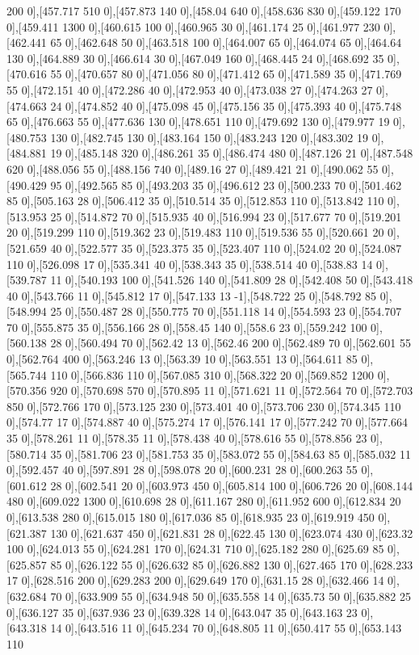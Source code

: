 {200 0],[457.717 510 0],[457.873 140 0],[458.04 640 0],[458.636 830 0],[459.122 170 0],[459.411 1300 0],[460.615 100 0],[460.965 30 0],[461.174 25 0],[461.977 230 0],[462.441 65 0],[462.648 50 0],[463.518 100 0],[464.007 65 0],[464.074 65 0],[464.64 130 0],[464.889 30 0],[466.614 30 0],[467.049 160 0],[468.445 24 0],[468.692 35 0],[470.616 55 0],[470.657 80 0],[471.056 80 0],[471.412 65 0],[471.589 35 0],[471.769 55 0],[472.151 40 0],[472.286 40 0],[472.953 40 0],[473.038 27 0],[474.263 27 0],[474.663 24 0],[474.852 40 0],[475.098 45 0],[475.156 35 0],[475.393 40 0],[475.748 65 0],[476.663 55 0],[477.636 130 0],[478.651 110 0],[479.692 130 0],[479.977 19 0],[480.753 130 0],[482.745 130 0],[483.164 150 0],[483.243 120 0],[483.302 19 0],[484.881 19 0],[485.148 320 0],[486.261 35 0],[486.474 480 0],[487.126 21 0],[487.548 620 0],[488.056 55 0],[488.156 740 0],[489.16 27 0],[489.421 21 0],[490.062 55 0],[490.429 95 0],[492.565 85 0],[493.203 35 0],[496.612 23 0],[500.233 70 0],[501.462 85 0],[505.163 28 0],[506.412 35 0],[510.514 35 0],[512.853 110 0],[513.842 110 0],[513.953 25 0],[514.872 70 0],[515.935 40 0],[516.994 23 0],[517.677 70 0],[519.201 20 0],[519.299 110 0],[519.362 23 0],[519.483 110 0],[519.536 55 0],[520.661 20 0],[521.659 40 0],[522.577 35 0],[523.375 35 0],[523.407 110 0],[524.02 20 0],[524.087 110 0],[526.098 17 0],[535.341 40 0],[538.343 35 0],[538.514 40 0],[538.83 14 0],[539.787 11 0],[540.193 100 0],[541.526 140 0],[541.809 28 0],[542.408 50 0],[543.418 40 0],[543.766 11 0],[545.812 17 0],[547.133 13 -1],[548.722 25 0],[548.792 85 0],[548.994 25 0],[550.487 28 0],[550.775 70 0],[551.118 14 0],[554.593 23 0],[554.707 70 0],[555.875 35 0],[556.166 28 0],[558.45 140 0],[558.6 23 0],[559.242 100 0],[560.138 28 0],[560.494 70 0],[562.42 13 0],[562.46 200 0],[562.489 70 0],[562.601 55 0],[562.764 400 0],[563.246 13 0],[563.39 10 0],[563.551 13 0],[564.611 85 0],[565.744 110 0],[566.836 110 0],[567.085 310 0],[568.322 20 0],[569.852 1200 0],[570.356 920 0],[570.698 570 0],[570.895 11 0],[571.621 11 0],[572.564 70 0],[572.703 850 0],[572.766 170 0],[573.125 230 0],[573.401 40 0],[573.706 230 0],[574.345 110 0],[574.77 17 0],[574.887 40 0],[575.274 17 0],[576.141 17 0],[577.242 70 0],[577.664 35 0],[578.261 11 0],[578.35 11 0],[578.438 40 0],[578.616 55 0],[578.856 23 0],[580.714 35 0],[581.706 23 0],[581.753 35 0],[583.072 55 0],[584.63 85 0],[585.032 11 0],[592.457 40 0],[597.891 28 0],[598.078 20 0],[600.231 28 0],[600.263 55 0],[601.612 28 0],[602.541 20 0],[603.973 450 0],[605.814 100 0],[606.726 20 0],[608.144 480 0],[609.022 1300 0],[610.698 28 0],[611.167 280 0],[611.952 600 0],[612.834 20 0],[613.538 280 0],[615.015 180 0],[617.036 85 0],[618.935 23 0],[619.919 450 0],[621.387 130 0],[621.637 450 0],[621.831 28 0],[622.45 130 0],[623.074 430 0],[623.32 100 0],[624.013 55 0],[624.281 170 0],[624.31 710 0],[625.182 280 0],[625.69 85 0],[625.857 85 0],[626.122 55 0],[626.632 85 0],[626.882 130 0],[627.465 170 0],[628.233 17 0],[628.516 200 0],[629.283 200 0],[629.649 170 0],[631.15 28 0],[632.466 14 0],[632.684 70 0],[633.909 55 0],[634.948 50 0],[635.558 14 0],[635.73 50 0],[635.882 25 0],[636.127 35 0],[637.936 23 0],[639.328 14 0],[643.047 35 0],[643.163 23 0],[643.318 14 0],[643.516 11 0],[645.234 70 0],[648.805 11 0],[650.417 55 0],[653.143 110 }

